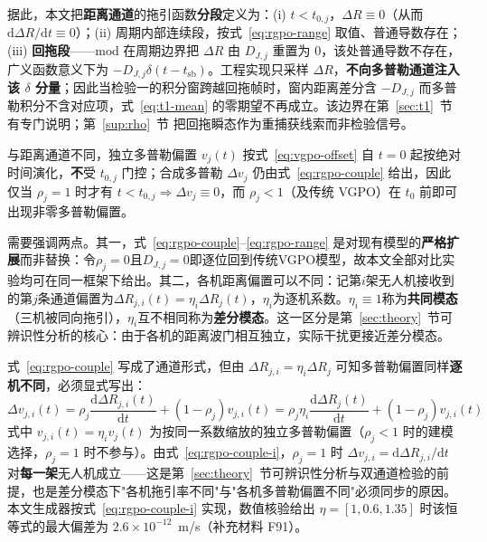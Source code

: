 \documentclass[UTF8,a4paper,zihao=-4]{ctexart}
\begin{document}
据此，本文把\textbf{距离通道}的拖引函数\textbf{分段}定义为：(i) $t<t_{0,j}$，$\Delta R\equiv0$（从而 $\mathrm{d}\Delta R/\mathrm{d}t\equiv0$）；(ii) 周期内部连续段，按式~\eqref{eq:rgpo-range} 取值、普通导数存在；(iii) \textbf{回拖段}——$\mathrm{mod}$ 在周期边界把 $\Delta R$ 由 $D_{J,j}$ 重置为 $0$，该处普通导数不存在，广义函数意义下为 $-D_{J,j}\delta(t-t_{\mathrm{sb}})$。工程实现只采样 $\Delta R$，\textbf{不向多普勒通道注入该 $\delta$ 分量}；因此当检验一的积分窗跨越回拖帧时，窗内距离差分含 $-D_{J,j}$ 而多普勒积分不含对应项，式~\eqref{eq:t1-mean} 的零期望不再成立。该边界在第~\ref{sec:t1}~节有专门说明；第~\ref{sup:rho}~节 把回拖瞬态作为重捕获线索而非检验信号。

与距离通道不同，独立多普勒偏置 \(v_j(t)\) 按式~\eqref{eq:vgpo-offset} 自 \(t=0\) 起按绝对时间演化，\textbf{不}受 \(t_{0,j}\) 门控；合成多普勒 \(\Delta v_j\) 仍由式~\eqref{eq:rgpo-couple} 给出，因此仅当 \(\rho_j=1\) 时才有 \(t<t_{0,j}\Rightarrow\Delta v_j\equiv0\)，而 \(\rho_j<1\)（及传统 VGPO）在 \(t_0\) 前即可出现非零多普勒偏置。

需要强调两点。其一，式~\eqref{eq:rgpo-couple}--\eqref{eq:rgpo-range} 是对现有模型的\textbf{严格扩展}而非替换：令\(\rho_j=0\)且\(D_{J,j}=0\)即逐位回到传统VGPO模型，故本文全部对比实验均可在同一框架下给出。其二，各机距离偏置可以不同：记第\(i\)架无人机接收到的第\(j\)条通道偏置为\(\Delta R_{j,i}(t)=\eta_i\Delta R_j(t)\)，\(\eta_i\)为逐机系数。\(\eta_i\equiv1\)称为\textbf{共同模态}（三机被同向拖引），\(\eta_i\)互不相同称为\textbf{差分模态}。这一区分是第~\ref{sec:theory}~节可辨识性分析的核心：由于各机的距离波门相互独立，实际干扰更接近差分模态。

式~\eqref{eq:rgpo-couple} 写成了通道形式，但由 \(\Delta R_{j,i}=\eta_i\Delta R_j\) 可知多普勒偏置同样\textbf{逐机不同}，必须显式写出：
\begin{equation}
\Delta v_{j,i}(t)=\rho_j\frac{\mathrm{d}\Delta R_{j,i}(t)}{\mathrm{d}t}+(1-\rho_j)v_{j,i}(t)
=\rho_j\eta_i\frac{\mathrm{d}\Delta R_j(t)}{\mathrm{d}t}+(1-\rho_j)v_{j,i}(t)
\label{eq:rgpo-couple-i}
\end{equation}
式中 \(v_{j,i}(t)=\eta_i v_j(t)\) 为按同一系数缩放的独立多普勒偏置（\(\rho_j<1\) 时的建模选择，\(\rho_j=1\) 时不参与）。由式~\eqref{eq:rgpo-couple-i}，\(\rho_j=1\) 时 \(\Delta v_{j,i}=\mathrm{d}\Delta R_{j,i}/\mathrm{d}t\) 对\textbf{每一架}无人机成立——这是第~\ref{sec:theory}~节可辨识性分析与双通道检验的前提，也是差分模态下"各机拖引率不同"与"各机多普勒偏置不同"必须同步的原因。本文生成器按式~\eqref{eq:rgpo-couple-i} 实现，数值核验给出 \(\eta=[1,0.6,1.35]\) 时该恒等式的最大偏差为 \(2.6\times10^{-12}\)~m/s（补充材料 F91）。
\end{document}
